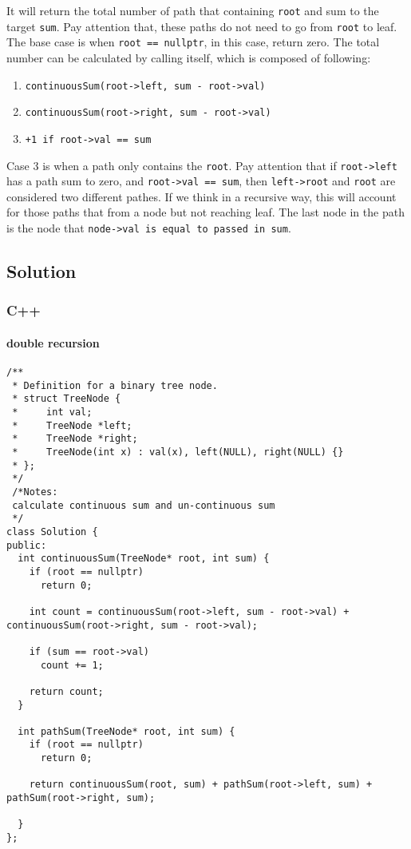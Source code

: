 \documentclass[12pt]{article}
\begin{document}
It will return the total number of path that containing \texttt{root} and sum to the target \texttt{sum}. Pay attention that, these paths do not need to go from \texttt{root} to leaf. The base case is when \texttt{root == nullptr}, in this case, return zero. The total number can be calculated by calling itself, which is composed of following:
\begin{enumerate}
\item \texttt{continuousSum(root->left, sum - root->val)}
\item \texttt{continuousSum(root->right, sum - root->val)}
\item \texttt{+1 if root->val == sum}
\end{enumerate}

Case 3 is when a path only contains the \texttt{root}. Pay attention that if \texttt{root->left} has a path sum to zero, and \texttt{root->val == sum}, then \texttt{left->root} and \texttt{root} are considered two different pathes. If we think in a recursive way, this will account for those paths that from a node but not reaching leaf. The last node in the path is the node that \texttt{node->val is equal to passed in sum}.
\subsection{Solution}
\label{sec:orga85cc3b}
\subsubsection{C++}
\label{sec:orga7e750c}
\paragraph{double recursion}
\label{sec:org990e351}
\begin{verbatim}
/**
 * Definition for a binary tree node.
 * struct TreeNode {
 *     int val;
 *     TreeNode *left;
 *     TreeNode *right;
 *     TreeNode(int x) : val(x), left(NULL), right(NULL) {}
 * };
 */
 /*Notes: 
 calculate continuous sum and un-continuous sum
 */
class Solution {
public:
  int continuousSum(TreeNode* root, int sum) {
    if (root == nullptr)
      return 0;

    int count = continuousSum(root->left, sum - root->val) + continuousSum(root->right, sum - root->val);

    if (sum == root->val)
      count += 1;

    return count;
  }

  int pathSum(TreeNode* root, int sum) {
    if (root == nullptr)
      return 0;

    return continuousSum(root, sum) + pathSum(root->left, sum) + pathSum(root->right, sum);

  }
};
\end{verbatim}
\end{document}
